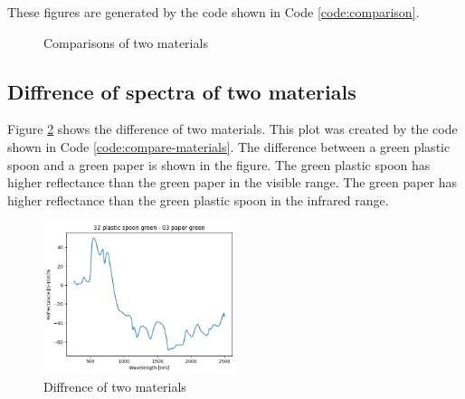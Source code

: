 These figures are generated by the code shown in Code \ref{code:comparison}.

\begin{figure}[H] %
  \centering
  \vspace{0.1cm}
  \caption[]{Comparisons of two materials}
  \label{fig:2mat}
\end{figure}

\subsection{Diffrence of spectra of two materials}
Figure \ref{fig:diff2mat} shows the difference of two materials. This
plot was created by the code shown in Code
\ref{code:compare-materials}. The difference between a green plastic
spoon and a green paper is shown in the figure. The green plastic
spoon has higher reflectance than the green paper in the visible
range. The green paper has higher reflectance than the green plastic
spoon in the infrared range.

\begin{figure}[H]
  \centering
  \caption{Diffrence of two materials}
  \label{fig:diff2mat}
  \includegraphics[width=0.5\textwidth]{./figs-task2/2spec-diff.png}
\end{figure}

